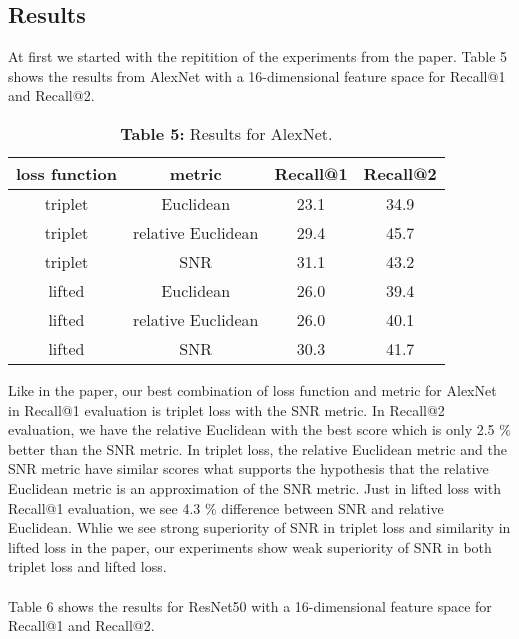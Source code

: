 \documentclass[12pt,paper=a4]{scrartcl}
\theoremstyle{break}
\begin{document}
\subsection{Results}
At first we started with the repitition of the experiments from the paper. Table 5 shows the results from AlexNet with a 16-dimensional feature space for Recall@1 and Recall@2.
\begin{table}[h]
\centering
  \begin{tabular}{| c | c | c | c |}
    \hline
     loss function & metric & Recall@1 & Recall@2 \\ \hline \hline
    triplet & Euclidean & 23.1 & 34.9 \\ \hline
    triplet & relative Euclidean & 29.4 & 45.7 \\ \hline
    triplet & SNR & 31.1 & 43.2 \\ \hline
    lifted & Euclidean & 26.0 & 39.4 \\ \hline
    lifted & relative Euclidean & 26.0 & 40.1 \\ \hline
    lifted & SNR & 30.3 & 41.7 \\
    \hline
  \end{tabular}
  \caption{\textbf{Table 5:} Results for AlexNet.}
\end{table}
Like in the paper, our best combination of loss function and metric for AlexNet in Recall@1 evaluation is triplet loss with the SNR metric. In Recall@2 evaluation, we have the relative Euclidean with the best score which is only 2.5 $\%$ better than the SNR metric. In triplet loss, the relative Euclidean metric and the SNR metric have similar scores what supports the hypothesis that the relative Euclidean metric is an approximation of the SNR metric. Just in lifted loss with Recall@1 evaluation, we see 4.3 $\%$ difference between SNR and relative Euclidean. Whlie we see strong superiority of SNR in triplet loss and similarity in lifted loss in the paper, our experiments show weak superiority of SNR in both triplet loss and lifted loss. \\ \\
Table 6 shows the results for ResNet50 with a 16-dimensional feature space for Recall@1 and Recall@2.
\end{document}
